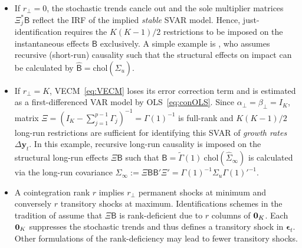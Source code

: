 \begin{itemize}
	\item If $ r_\perp = 0 $, the stochastic trends cancle out and the sole multiplier matrices $ \Xi_j^* \mathsf{B} $ reflect the IRF of the implied \textit{stable} SVAR model. Hence, just-identification requires the $ K(K-1)/2 $ restrictions to be imposed on the instantaneous effects $\mathsf{B} $ exclusively. A simple example is \cite{Sims1980}, who assumes recursive (short-run) causality such that the structural effects on impact can be calculated by $ \widehat{\textsf{B}} = \text{chol} \left( \widehat{\Sigma}_{u} \right) $.
	
	\item If $ r_\perp = K $, VECM~\eqref{eq:VECM} loses its error correction term and is estimated as a first-differenced VAR model by OLS~\eqref{eq:conOLS}. Since $ \alpha_\perp = \beta_\perp = I_K $, matrix $ \Xi = \left(I_K - \sum_{j=1}^{p-1} \Gamma_{j} \right)^{-1} = \Gamma(1)^{-1} $ is full-rank and $ K(K-1)/2 $ long-run restrictions are sufficient for identifying this SVAR of \textit{growth rates} $ \Delta \boldsymbol{y}_{t} $. In this example, recursive long-run causality is imposed on the structural long-run effects $ \Xi \mathsf{B} $ such that $ \widehat{\textsf{B}} = \widetilde{\Gamma}(1) \ \text{chol}\left( \widehat{\Sigma}_{\infty} \right) $ is calculated via the long-run covariance $ \Sigma_\infty := \Xi \mathsf{B} \mathsf{B}'\Xi' = \Gamma(1)^{-1} \Sigma_u \Gamma(1)'^{-1} $. 
	
	\item A cointegration rank $ r $ implies $ r_\perp $ permanent shocks at minimum and conversely $ r $ transitory shocks at maximum. Identifications schemes in the tradition of \citet{KingEtAl1991} assume that $ \Xi \mathsf{B} $ is rank-deficient due to $ r $ columns of $ {\bf 0}_K $. Each $ {\bf 0}_K $ suppresses the stochastic trends and thus defines a transitory shock in $ \boldsymbol{\epsilon}_{t} $. Other formulations of the rank-deficiency may lead to fewer transitory shocks.
\end{itemize} 


